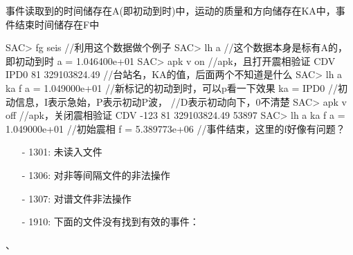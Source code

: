 事件读取到的时间储存在A(即初动到时)中，运动的质量和方向储存在KA中，事件结束时间储存在F中

\begin{SACCode}
SAC> fg seis                //利用这个数据做个例子
SAC> lh a                   //这个数据本身是标有A的，即初动到时
     a = 1.046400e+01
SAC> apk v on               //apk，且打开震相验证
 CDV IPD0 81 329103824.49   //台站名，KA的值，后面两个不知道是什么
SAC> lh a ka f
      a = 1.049000e+01      //新标记的初动到时，可以p看一下效果
     ka = IPD0              //初动信息，I表示急始，P表示初动P波，
                            //D表示初动向下，0不清楚
SAC> apk v off              //apk，关闭震相验证
 CDV -123 81 329103824.49   53897
SAC> lh a ka f
     a = 1.049000e+01       //初始震相
     f = 5.389773e+06       //事件结束，这里的f好像有问题？
\end{SACCode}

\begin{itemize}
\item[-]1301: 未读入文件
\item[-]1306: 对非等间隔文件的非法操作
\item[-]1307: 对谱文件非法操作
\end{itemize}

\begin{itemize}
\item[-]1910: 下面的文件没有找到有效的事件：
\end{itemize}

、
